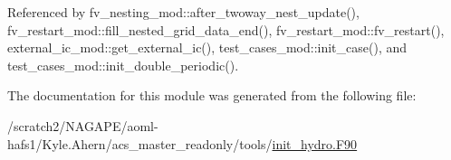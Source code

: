 Referenced by fv\-\_\-nesting\-\_\-mod\-::after\-\_\-twoway\-\_\-nest\-\_\-update(), fv\-\_\-restart\-\_\-mod\-::fill\-\_\-nested\-\_\-grid\-\_\-data\-\_\-end(), fv\-\_\-restart\-\_\-mod\-::fv\-\_\-restart(), external\-\_\-ic\-\_\-mod\-::get\-\_\-external\-\_\-ic(), test\-\_\-cases\-\_\-mod\-::init\-\_\-case(), and test\-\_\-cases\-\_\-mod\-::init\-\_\-double\-\_\-periodic().



The documentation for this module was generated from the following file\-:\begin{DoxyCompactItemize}
\item 
/scratch2/\-N\-A\-G\-A\-P\-E/aoml-\/hafs1/\-Kyle.\-Ahern/acs\-\_\-master\-\_\-readonly/tools/\hyperlink{init__hydro_8F90}{init\-\_\-hydro.\-F90}\end{DoxyCompactItemize}
